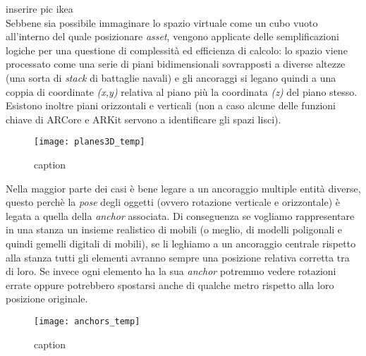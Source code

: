 \todo{} inserire pic ikea\\

Sebbene sia possibile immaginare lo spazio virtuale come un cubo vuoto all'interno del quale posizionare \textit{asset}, vengono applicate delle semplificazioni logiche per una questione di complessità ed efficienza di calcolo: lo spazio viene processato come una serie di piani bidimensionali sovrapposti a diverse altezze (una sorta di \textit{stack} di battaglie navali) e gli ancoraggi si legano quindi a una coppia di coordinate \textit{(x,y)} relativa al piano più la coordinata \textit{(z)} del piano stesso. Esistono inoltre piani orizzontali e verticali (non a caso alcune delle funzioni chiave di ARCore e ARKit servono a identificare gli spazi lisci).

\begin{figure}[H]
  \centering
  \texttt{[image: planes3D\_temp]}
  \caption[Piani in realtà aumentata]{caption \todo}
\end{figure}

Nella maggior parte dei casi è bene legare a un ancoraggio multiple entità diverse, questo perchè la \textit{pose} degli oggetti (ovvero rotazione verticale e orizzontale) è legata a quella della \textit{anchor} associata. Di conseguenza se vogliamo rappresentare in una stanza un insieme realistico di mobili (o meglio, di modelli poligonali e quindi gemelli digitali di mobili), se li leghiamo a un ancoraggio centrale rispetto alla stanza tutti gli elementi avranno sempre una posizione relativa corretta tra di loro. Se invece ogni elemento ha la sua \textit{anchor} potremmo vedere rotazioni errate oppure potrebbero spostarsi anche di qualche metro rispetto alla loro posizione originale.

\begin{figure}[H]
  \centering
  \texttt{[image: anchors\_temp]}
  \caption[Ancoraggi singoli per multipli elementi]{caption \todo}
\end{figure}

